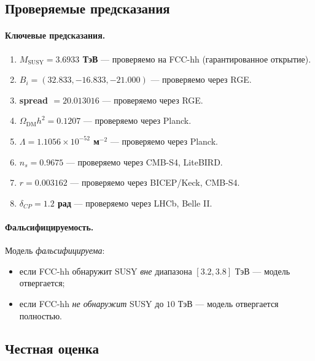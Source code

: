 \documentclass[11pt,a4paper]{article}
\newcommand{\MSUSY}{M_{\text{SUSY}}}
\theoremstyle{definition}
\begin{document}
\subsection{Проверяемые предсказания}
\label{subsec:conclusions-predictions}

\paragraph{Ключевые предсказания.}
\begin{enumerate}
    \item \textbf{$\MSUSY = 3.6933$ ТэВ} — проверяемо на FCC-hh 
          (гарантированное открытие).
    \item \textbf{$B_i = (32.833, -16.833, -21.000)$} — 
          проверяемо через RGE.
    \item \textbf{spread $= 20.013016$} — проверяемо через RGE.
    \item \textbf{$\Omega_{\text{DM}} h^2 = 0.1207$} — 
          проверяемо через Planck.
    \item \textbf{$\Lambda = 1.1056 \times 10^{-52}$ м$^{-2}$} — 
          проверяемо через Planck.
    \item \textbf{$n_s = 0.9675$} — проверяемо через CMB-S4, 
          LiteBIRD.
    \item \textbf{$r = 0.003162$} — проверяемо через BICEP/Keck, 
          CMB-S4.
    \item \textbf{$\delta_{CP} = 1.2$ рад} — проверяемо через 
          LHCb, Belle II.
\end{enumerate}

\paragraph{Фальсифицируемость.}
Модель \emph{фальсифицируема}:
\begin{itemize}
    \item если FCC-hh обнаружит SUSY \emph{вне} диапазона 
          $[3.2, 3.8]$ ТэВ — модель отвергается;
    \item если FCC-hh \emph{не обнаружит} SUSY до $10$ ТэВ — 
          модель отвергается полностью.
\end{itemize}

\subsection{Честная оценка}
\label{subsec:conclusions-honest}
\end{document}
